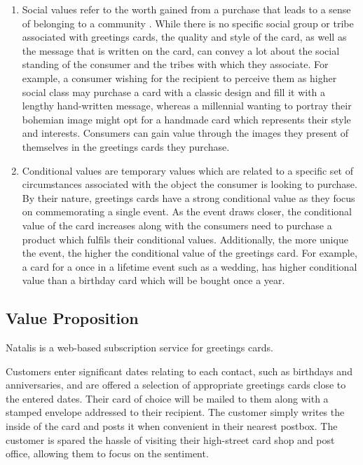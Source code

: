 \documentclass[10pt,a4paper]{article}
\begin{document}
\begin{enumerate}
  \item Social values refer to the worth gained from a purchase that leads to a sense of belonging to a community \citep{sheth1991we}. While there is no specific social group or tribe \citep{canniford2011manage} associated with greetings cards, the quality and style of the card, as well as the message that is written on the card, can convey a lot about the social standing of the consumer and the tribes with which they associate. For example, a consumer wishing for the recipient to perceive them as higher social class may purchase a card with a classic design and fill it with a lengthy hand-written message, whereas a millennial wanting to portray their bohemian image might opt for a handmade card which represents their style and interests. Consumers can gain value through the images they present of themselves in the greetings cards they purchase.
  \item Conditional values \citep{sheth1991we} are temporary values which are related to a specific set of circumstances associated with the object the consumer is looking to purchase. By their nature, greetings cards have a strong conditional value as they focus on commemorating a single event. As the event draws closer, the conditional value of the card increases along with the consumers need to purchase a product which fulfils their conditional values. Additionally, the more unique the event, the higher the conditional value of the greetings card. For example, a card for a once in a lifetime event such as a wedding, has higher conditional value than a birthday card which will be bought once a year.
\end{enumerate}

\subsection*{Value Proposition}
Natalis is a web-based subscription service for greetings cards.

Customers enter significant dates relating to each contact, such as birthdays and anniversaries, and are offered a selection of appropriate greetings cards close to the entered dates. Their card of choice will be mailed to them along with a stamped envelope addressed to their recipient. The customer simply writes the inside of the card and posts it when convenient in their nearest postbox. The customer is spared the hassle of visiting their high-street card shop and post office, allowing them to focus on the sentiment.
\end{document}
